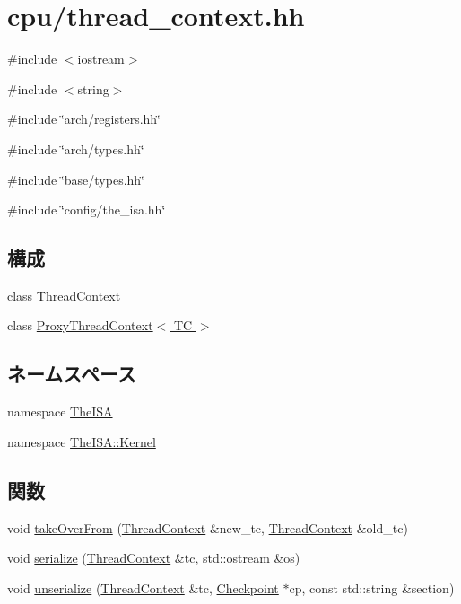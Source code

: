 \hypertarget{thread__context_8hh}{
\section{cpu/thread\_\-context.hh}
\label{thread__context_8hh}
}
{\ttfamily \#include $<$iostream$>$}\par
{\ttfamily \#include $<$string$>$}\par
{\ttfamily \#include \char`\"{}arch/registers.hh\char`\"{}}\par
{\ttfamily \#include \char`\"{}arch/types.hh\char`\"{}}\par
{\ttfamily \#include \char`\"{}base/types.hh\char`\"{}}\par
{\ttfamily \#include \char`\"{}config/the\_\-isa.hh\char`\"{}}\par
\subsection*{構成}
\begin{DoxyCompactItemize}
\item 
class \hyperlink{classThreadContext}{ThreadContext}
\item 
class \hyperlink{classProxyThreadContext}{ProxyThreadContext$<$ TC $>$}
\end{DoxyCompactItemize}
\subsection*{ネームスペース}
\begin{DoxyCompactItemize}
\item 
namespace \hyperlink{namespaceTheISA}{TheISA}
\item 
namespace \hyperlink{namespaceTheISA_1_1Kernel}{TheISA::Kernel}
\end{DoxyCompactItemize}
\subsection*{関数}
\begin{DoxyCompactItemize}
\item 
void \hyperlink{thread__context_8hh_a5f8808341daf3a8e3d0deb3852b1855f}{takeOverFrom} (\hyperlink{classThreadContext}{ThreadContext} \&new\_\-tc, \hyperlink{classThreadContext}{ThreadContext} \&old\_\-tc)
\end{DoxyCompactItemize}
\begin{Indent}{\bf }\par
{\em \label{_amgrpd41d8cd98f00b204e9800998ecf8427e}
 }\begin{DoxyCompactItemize}
\item 
void \hyperlink{thread__context_8hh_a40792bd7060f1fdd6c31469ce46d0a95}{serialize} (\hyperlink{classThreadContext}{ThreadContext} \&tc, std::ostream \&os)
\item 
void \hyperlink{thread__context_8hh_aab2bbbf3710db70a2886ed6c49038af7}{unserialize} (\hyperlink{classThreadContext}{ThreadContext} \&tc, \hyperlink{classCheckpoint}{Checkpoint} $\ast$cp, const std::string \&section)
\end{DoxyCompactItemize}
\end{Indent}


